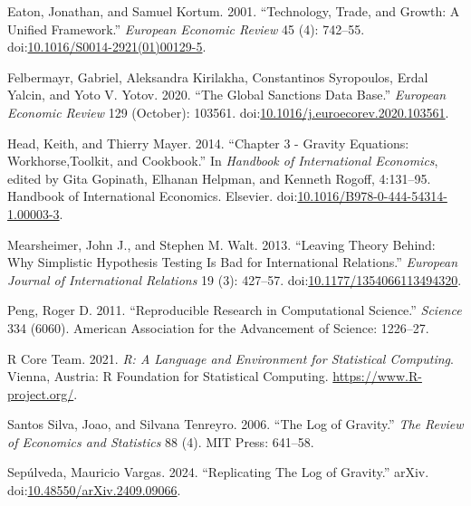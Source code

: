 \documentclass[letterpaper,twoside,12pt]{article}
\newlength{\cslhangindent}
\newenvironment{CSLReferences}[2] %
 {\begin{list}{}{%
  \setlength{\itemindent}{0pt}
  \setlength{\leftmargin}{0pt}
  \setlength{\parsep}{0pt}
  \ifodd #1
   \setlength{\leftmargin}{\cslhangindent}
   \setlength{\itemindent}{-1\cslhangindent}
  \fi
  \setlength{\itemsep}{#2\baselineskip}}}
 {\end{list}}
\begin{document}
\label{refs}
\begin{CSLReferences}{1}{0}
Eaton, Jonathan, and Samuel Kortum. 2001. {``Technology, Trade, and
Growth: {A} Unified Framework.''} \emph{European Economic Review} 45
(4): 742--55.
doi:\href{https://doi.org/10.1016/S0014-2921(01)00129-5}{10.1016/S0014-2921(01)00129-5}.

Felbermayr, Gabriel, Aleksandra Kirilakha, Constantinos Syropoulos,
Erdal Yalcin, and Yoto V. Yotov. 2020. {``The Global Sanctions Data
Base.''} \emph{European Economic Review} 129 (October): 103561.
doi:\href{https://doi.org/10.1016/j.euroecorev.2020.103561}{10.1016/j.euroecorev.2020.103561}.

Head, Keith, and Thierry Mayer. 2014. {``Chapter 3 - {Gravity}
{Equations}: {Workhorse},{Toolkit}, and {Cookbook}.''} In \emph{Handbook
of {International} {Economics}}, edited by Gita Gopinath, Elhanan
Helpman, and Kenneth Rogoff, 4:131--95. Handbook of {International}
{Economics}. Elsevier.
doi:\href{https://doi.org/10.1016/B978-0-444-54314-1.00003-3}{10.1016/B978-0-444-54314-1.00003-3}.

Mearsheimer, John J., and Stephen M. Walt. 2013. {``Leaving Theory
Behind: {Why} Simplistic Hypothesis Testing Is Bad for {International}
{Relations}.''} \emph{European Journal of International Relations} 19
(3): 427--57.
doi:\href{https://doi.org/10.1177/1354066113494320}{10.1177/1354066113494320}.

Peng, Roger D. 2011. {``Reproducible Research in Computational
Science.''} \emph{Science} 334 (6060). American Association for the
Advancement of Science: 1226--27.

R Core Team. 2021. \emph{R: A Language and Environment for Statistical
Computing}. Vienna, Austria: R Foundation for Statistical Computing.
\url{https://www.R-project.org/}.

Santos Silva, Joao, and Silvana Tenreyro. 2006. {``The Log of
Gravity.''} \emph{The Review of Economics and Statistics} 88 (4). MIT
Press: 641--58.

Sepúlveda, Mauricio Vargas. 2024. {``Replicating {The} {Log} of
{Gravity}.''} arXiv.
doi:\href{https://doi.org/10.48550/arXiv.2409.09066}{10.48550/arXiv.2409.09066}.


\end{CSLReferences}
\end{document}
